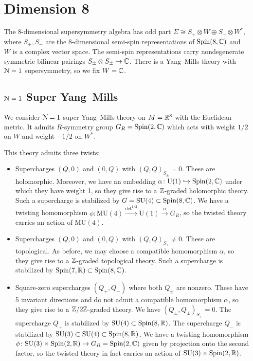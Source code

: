 \documentclass[10pt, oneside]{article}
\newcommand{\MU}{\mathrm{MU}}
\renewcommand{\U}{\mathrm{U}}
\begin{document}
\section{Dimension 8}

The 8-dimensional supersymmetry algebra has odd part $\Sigma\cong S_+\otimes W\oplus S_-\otimes W^*$, where $S_+, S_-$ are the 8-dimensional semi-spin representations of $\mathrm{Spin}(8, \mathbb C)$ and $W$ is a complex vector space. The semi-spin representations carry nondegenerate symmetric bilinear pairings $S_{\pm}\otimes S_{\pm}\rightarrow \mathbb C$. There is a Yang--Mills theory with $\mathcal{N}=1$ supersymmetry, so we fix $W = \mathbb C$.

\subsection{\texorpdfstring{$\mathcal N=1$}{N=1} Super Yang--Mills}

We consider $\mathcal N=1$ super Yang--Mills theory on $M=\mathbb R^8$ with the Euclidean metric. It admits $R$-symmetry group $G_R=\mathrm{Spin}(2, \mathbb C)$ which acts with weight $1/2$ on $W$ and weight $-1/2$ on $W^*$.

This theory admits three twists:
\begin{itemize}
\item Supercharges $(Q, 0)$ and $(0, Q)$ with $(Q, Q)_{S_\pm} = 0$. These are holomorphic. Moreover, we have an embedding $\alpha\colon \U(1)\hookrightarrow \Spin(2, \CC)$ under which they have weight 1, so they give rise to a $\mathbb Z$-graded holomorphic theory. Such a supercharge is stabilized by $G=\mathrm{SU}(4)\subset \mathrm{Spin}(8, \mathbb C)$. We have a twisting homomorphism $\phi\colon \MU(4)\xrightarrow{\det^{1/2}} \U(1)\xrightarrow{\alpha} G_R$, so the twisted theory carries an action of $\MU(4)$.

\item Supercharges $(Q, 0)$ and $(0, Q)$ with $(Q, Q)_{S_\pm}\neq 0$. These are topological. As before, we may choose a compatible homomorphism $\alpha$, so they give rise to a $\mathbb Z$-graded topological theory. Such a supercharge is stabilized by $\mathrm{Spin}(7, \mathbb R)\subset \mathrm{Spin}(8, \mathbb C)$.

\item Square-zero supercharges $(Q_+, Q_-)$ where both $Q_{\pm}$ are nonzero. These have 5 invariant directions and do not admit a compatible homomorphism $\alpha$, so they give rise to a $\mathbb Z/2\mathbb Z$-graded theory. We have $(Q_\pm, Q_\pm)_{S_\pm} = 0$. The supercharge $Q_+$ is stabilized by $\mathrm{SU}(4)\subset \mathrm{Spin}(8, \mathbb R)$. The supercharge $Q_-$ is stabilized by $\mathrm{SU}(3)\subset \mathrm{SU}(4)\subset \mathrm{Spin}(8, \mathbb R)$. We have a twisting homomorphism $\phi\colon \mathrm{SU}(3)\times \mathrm{Spin}(2, \mathbb R)\rightarrow G_R=\mathrm{Spin}(2, \mathbb C)$ given by projection onto the second factor, so the twisted theory in fact carries an action of $\mathrm{SU}(3)\times \mathrm{Spin}(2, \mathbb R)$.
\end{itemize}
\end{document}
